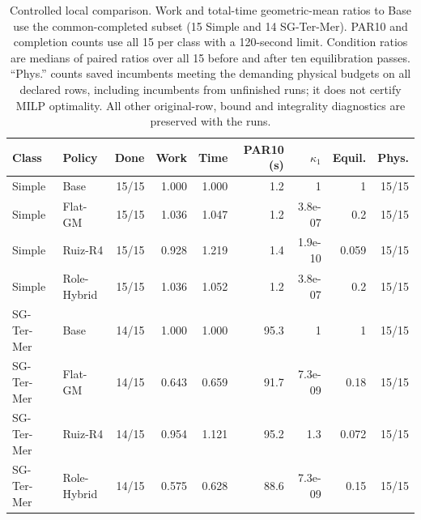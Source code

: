 \begin{table}[tb]
\centering\scriptsize\setlength{\tabcolsep}{3pt}
\caption{Controlled local comparison. Work and total-time geometric-mean ratios to Base
use the common-completed subset (15 Simple and 14 SG-Ter-Mer).
PAR10 and completion counts use all 15 per class with a 120-second limit.
Condition ratios are medians of paired ratios over all 15 before and after ten
equilibration passes. ``Phys.'' counts saved incumbents meeting the demanding physical
budgets on all declared rows, including incumbents from unfinished runs; it does not
certify MILP optimality. All other original-row, bound and integrality diagnostics
are preserved with the runs.}\label{tab:oms-comparison}
\begin{tabular}{llrrrrrrr}
\toprule
Class & Policy & Done & Work & Time & PAR10 (s) & $\kappa_1$ & Equil. & Phys.\\
\midrule
Simple & Base & 15/15 & 1.000 & 1.000 & 1.2 & 1 & 1 & 15/15 \\
Simple & Flat-GM & 15/15 & 1.036 & 1.047 & 1.2 & 3.8e-07 & 0.2 & 15/15 \\
Simple & Ruiz-R4 & 15/15 & 0.928 & 1.219 & 1.4 & 1.9e-10 & 0.059 & 15/15 \\
Simple & Role-Hybrid & 15/15 & 1.036 & 1.052 & 1.2 & 3.8e-07 & 0.2 & 15/15 \\
SG-Ter-Mer & Base & 14/15 & 1.000 & 1.000 & 95.3 & 1 & 1 & 15/15 \\
SG-Ter-Mer & Flat-GM & 14/15 & 0.643 & 0.659 & 91.7 & 7.3e-09 & 0.18 & 15/15 \\
SG-Ter-Mer & Ruiz-R4 & 14/15 & 0.954 & 1.121 & 95.2 & 1.3 & 0.072 & 15/15 \\
SG-Ter-Mer & Role-Hybrid & 14/15 & 0.575 & 0.628 & 88.6 & 7.3e-09 & 0.15 & 15/15 \\
\bottomrule\end{tabular}
\end{table}
